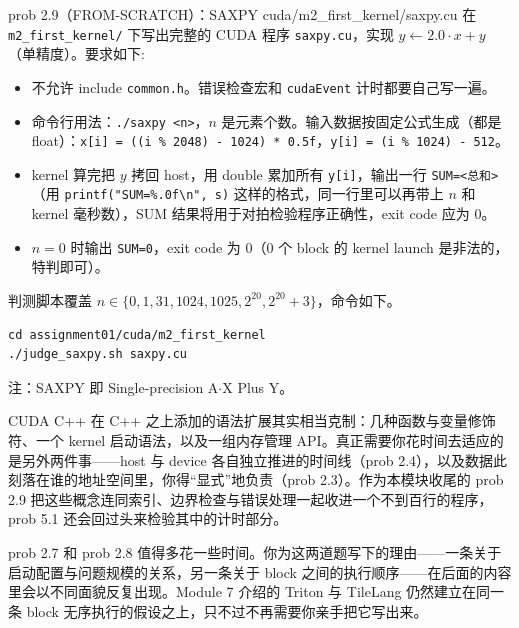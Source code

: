 \documentclass[11pt,a4paper,fontset=none]{ctexart}
\begin{document}
\begin{capstone}{prob 2.9（FROM-SCRATCH）：SAXPY \hfill {\footnotesize\ttfamily cuda/m2\_first\_kernel/saxpy.cu}}
在 \texttt{m2\_first\_kernel/} 下写出完整的 CUDA 程序 \texttt{saxpy.cu}，实现 $y \leftarrow 2.0 \cdot x + y$（单精度）。要求如下:
\begin{itemize}
  \item 不允许 include \texttt{common.h}。错误检查宏和 \texttt{cudaEvent} 计时都要自己写一遍。
  \item 命令行用法：\texttt{./saxpy <n>}，$n$ 是元素个数。输入数据按固定公式生成（都是 float）：\texttt{x[i] = ((i \% 2048) - 1024) * 0.5f}，\texttt{y[i] = (i \% 1024) - 512}。
  \item kernel 算完把 $y$ 拷回 host，用 double 累加所有 \texttt{y[i]}，输出一行 \texttt{SUM=<总和>}（用 \texttt{printf("SUM=\%.0f\textbackslash n", s)} 这样的格式，同一行里可以再带上 $n$ 和 kernel 毫秒数），SUM 结果将用于对拍检验程序正确性，exit code 应为 0。
  \item $n = 0$ 时输出 \texttt{SUM=0}，exit code 为 0（0 个 block 的 kernel launch 是非法的，特判即可）。
\end{itemize}
\end{capstone}

判测脚本覆盖 $n \in \{0, 1, 31, 1024, 1025, 2^{20}, 2^{20}{+}3\}$，命令如下。

\begin{lstlisting}
cd assignment01/cuda/m2_first_kernel
./judge_saxpy.sh saxpy.cu
\end{lstlisting}

注：SAXPY 即 Single-precision A$\cdot$X Plus Y。

\begin{lookback}
CUDA C++ 在 C++ 之上添加的语法扩展其实相当克制：几种函数与变量修饰符、一个 kernel 启动语法，以及一组内存管理 API。真正需要你花时间去适应的是另外两件事——host 与 device 各自独立推进的时间线（prob 2.4），以及数据此刻落在谁的地址空间里，你得“显式”地负责（prob 2.3）。作为本模块收尾的 prob 2.9 把这些概念连同索引、边界检查与错误处理一起收进一个不到百行的程序，prob 5.1 还会回过头来检验其中的计时部分。

prob 2.7 和 prob 2.8 值得多花一些时间。你为这两道题写下的理由——一条关于启动配置与问题规模的关系，另一条关于 block 之间的执行顺序——在后面的内容里会以不同面貌反复出现。Module 7 介绍的 Triton 与 TileLang 仍然建立在同一条 block 无序执行的假设之上，只不过不再需要你亲手把它写出来。
\end{lookback}

\end{document}
